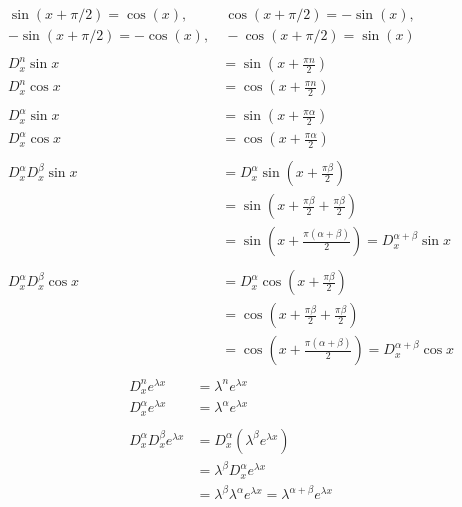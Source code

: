 \documentclass{article}
\theoremstyle{plain}
\theoremstyle{definition}
\begin{document}
\begin{align*}
	\sin(x+\pi/2) = \cos(x),&\ \cos(x+\pi/2) = -\sin (x),\\
	-\sin(x+\pi/2) = -\cos(x),&\ -\cos(x+\pi/2) = \sin(x) \\
	\\
	D_x^n \sin x &= \sin \left(x+\frac{\pi n}{2}\right) \\
	D_x^n \cos x &= \cos \left(x+\frac{\pi n}{2}\right) \\
	\\
	D_x^\alpha \sin x &= \sin \left(x+\frac{\pi \alpha}{2}\right) \\
	D_x^\alpha \cos x &= \cos \left(x+\frac{\pi \alpha}{2}\right) \\
	\\
	D_x^\alpha D_x^\beta \sin x 
	&= 	D_x^\alpha \sin \left(x+\frac{\pi \beta}{2}\right) \\
	&= 	\sin \left(x+\frac{\pi \beta}{2}+\frac{\pi \beta}{2}\right) \\
	&= 	\sin \left(x+\frac{\pi (\alpha+\beta)}{2}\right) 
	= D_x^{\alpha+\beta} \sin x\\
	\\
	D_x^\alpha D_x^\beta \cos x 
	&= 	D_x^\alpha \cos \left(x+\frac{\pi \beta}{2}\right) \\
	&= 	\cos \left(x+\frac{\pi \beta}{2}+\frac{\pi \beta}{2}\right) \\
	&= 	\cos \left(x+\frac{\pi (\alpha+\beta)}{2}\right) 
	= D_x^{\alpha+\beta} \cos x\\
\end{align*}
\begin{align*}
	D_x^n e^{\lambda x} &= \lambda^n e^{\lambda x} \\
	D_x^\alpha e^{\lambda x} &= \lambda^\alpha e^{\lambda x} \\
	\\
	D_x^\alpha D_x^\beta e^{\lambda x} &= D_x^\alpha\left( \lambda^\beta
	e^{\lambda x}\right) \\
	&= \lambda^\beta D_x^\alpha e^{\lambda x} \\
	&= \lambda^\beta \lambda^\alpha e^{\lambda x} 
	= \lambda^{\alpha+\beta} e^{\lambda x}\\
\end{align*}
\newpage
\end{document}
